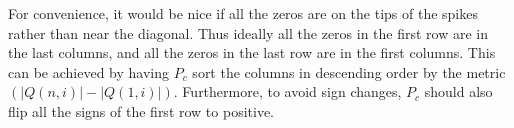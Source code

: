 \documentclass{article}
\newcommand{\s}{\vec{\sigma}}
\newcommand{\e}{\varepsilon}
\begin{document}
For convenience, it would be nice if all the zeros are on the tips of the
spikes rather than near the diagonal.
Thus ideally all the zeros in the first row are in the last columns,
and all the zeros in the last row are in the first columns.
This can be achieved by having $P_c$ sort the columns in descending
order by the metric $(|Q(n,i)| - |Q(1,i)|)$.
Furthermore, to avoid sign changes, $P_c$ should also flip all the
signs of the first row to positive.

%
%
%
%
\end{document}
